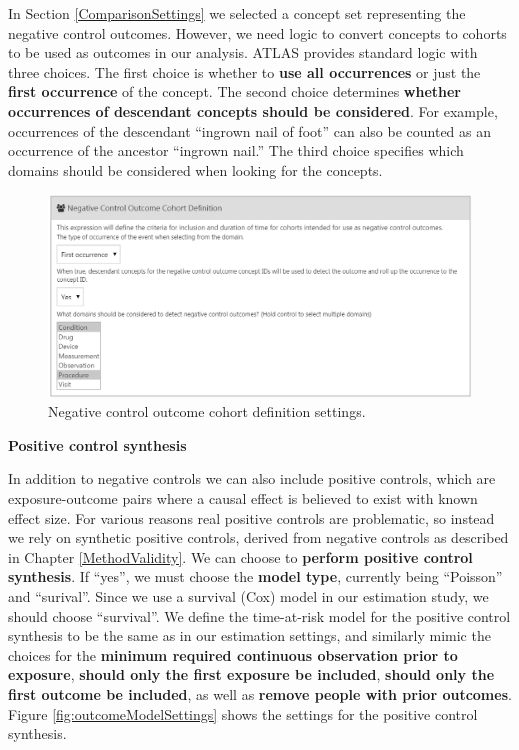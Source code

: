 \documentclass[11pt]{book}
\theoremstyle{definition}
\theoremstyle{definition}
\theoremstyle{definition}
\theoremstyle{remark}
\begin{document}
In Section \ref{ComparisonSettings} we selected a concept set representing the negative control outcomes. However, we need logic to convert concepts to cohorts to be used as outcomes in our analysis. ATLAS provides standard logic with three choices. The first choice is whether to \textbf{use all occurrences} or just the \textbf{first occurrence} of the concept. The second choice determines \textbf{whether occurrences of descendant concepts should be considered}. For example, occurrences of the descendant ``ingrown nail of foot'' can also be counted as an occurrence of the ancestor ``ingrown nail.'' The third choice specifies which domains should be considered when looking for the concepts.

\begin{figure}

{\centering \includegraphics[width=1\linewidth]{images/PopulationLevelEstimation/ncSettings} 

}

\caption{Negative control outcome cohort definition settings.}\label{fig:ncSettings}
\end{figure}

\textbf{Positive control synthesis}

In addition to negative controls we can also include positive controls, which are exposure-outcome pairs where a causal effect is believed to exist with known effect size. For various reasons real positive controls are problematic, so instead we rely on synthetic positive controls, derived from negative controls as described in Chapter \ref{MethodValidity}. We can choose to \textbf{perform positive control synthesis}. If ``yes'', we must choose the \textbf{model type}, currently being ``Poisson'' and ``surival''. Since we use a survival (Cox) model in our estimation study, we should choose ``survival''. We define the time-at-risk model for the positive control synthesis to be the same as in our estimation settings, and similarly mimic the choices for the \textbf{minimum required continuous observation prior to exposure}, \textbf{should only the first exposure be included}, \textbf{should only the first outcome be included}, as well as \textbf{remove people with prior outcomes}. Figure \ref{fig:outcomeModelSettings} shows the settings for the positive control synthesis.
\end{document}

